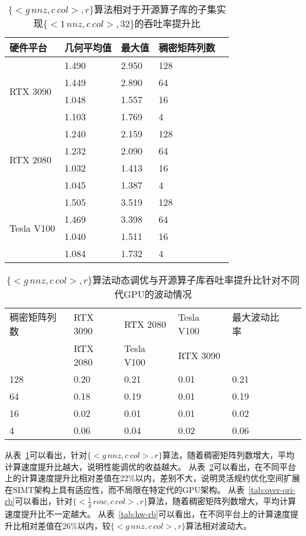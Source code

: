 \begin{table}
  \centering
  \caption{$\{<g\,nnz , c\,col>,r\}$算法相对于开源算子库的子集实现$\{<1\,nnz , c\,col>,32\}$的吞吐率提升比}
  \begin{tabular}{lllll}
  \toprule
  硬件平台 & 几何平均值  & 最大值 & 稠密矩阵列数 \\
  \midrule
  \multirow{4}{*}{RTX 3090}& 1.490  & 2.950  & 128\\
                          & 1.449   & 2.890  & 64\\
                          & 1.048   & 1.557  & 16\\
                          & 1.103   & 1.769 & 4\\
  \hline
  \multirow{4}{*}{RTX 2080}& 1.240   & 2.159  & 128\\
                          & 1.232   & 2.090  & 64\\
                          & 1.032   & 1.413  & 16\\
                          & 1.045   & 1.387  & 4\\
  \hline
  \multirow{4}{*}{Tesla V100}   & 1.505   & 3.519  & 128\\
                          & 1.469   & 3.398  & 64\\
                          & 1.040   & 1.511  & 16\\
                          & 1.084   & 1.732  & 4\\
  \bottomrule
  \end{tabular}
  \label{tab:over-ori-eb}%
\end{table}
\begin{table}
  \centering
  \caption{$\{<g\,nnz , c\,col>,r\}$算法动态调优与开源算子库吞吐率提升比针对不同代GPU的波动情况}
  \begin{tabular}{llllll}
  \toprule
  稠密矩阵列数 & RTX 3090 & RTX 2080   & Tesla V100 & 最大波动比率 \\
    & RTX 2080 & Tesla V100 & RTX 3090   &  \\
  \midrule
  128 & 0.20 & 0.21 & 0.01 & 0.21 \\
  64  & 0.18 & 0.19 & 0.01 & 0.19 \\
  16  & 0.02 & 0.01 & 0.01 & 0.02 \\
  4   & 0.06 & 0.04 & 0.02 & 0.06 \\
  \bottomrule
  \end{tabular}
  \label{tab:hw-eb}
\end{table}
从表~\ref{tab:over-ori-eb}可以看出，针对$\{<g\,nnz , c\,col>,r\}$算法，随着稠密矩阵列数增大，平均计算速度提升比越大，说明性能调优的收益越大。
从表~\ref{tab:hw-eb}可以看出，在不同平台上的计算速度提升比相对差值在22\%以内，差别不大，说明灵活规约优化空间扩展在SIMT架构上具有适应性，而不局限在特定代的GPU架构。
从表~\ref{tab:over-ori-rb}可以看出，针对$\{<\frac{1}{g}\,row , c\,col>,r\}$算法，随着稠密矩阵列数增大，平均计算速度提升比不一定越大。
从表~\ref{tab:hw-rb}可以看出，在不同平台上的计算速度提升比相对差值在26\%以内，较$\{<g\,nnz , c\,col>,r\}$算法相对波动大。
